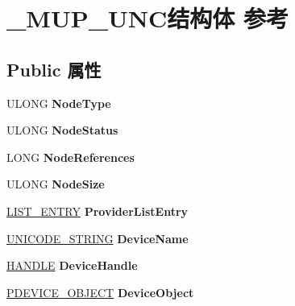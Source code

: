 \hypertarget{struct___m_u_p___u_n_c}{}\section{\+\_\+\+M\+U\+P\+\_\+\+U\+N\+C结构体 参考}
\label{struct___m_u_p___u_n_c}
\subsection*{Public 属性}
\begin{DoxyCompactItemize}
\item 
\mbox{\label{struct___m_u_p___u_n_c_ac0dc870206d93e0671028ed61d22523f}} 
U\+L\+O\+NG {\bfseries Node\+Type}
\item 
\mbox{\label{struct___m_u_p___u_n_c_abfa64a661474c972dedb7fb77a5fccd2}} 
U\+L\+O\+NG {\bfseries Node\+Status}
\item 
\mbox{\label{struct___m_u_p___u_n_c_a81c50d2c22b7f99720c29022b6cc6d22}} 
L\+O\+NG {\bfseries Node\+References}
\item 
\mbox{\label{struct___m_u_p___u_n_c_ad26d91a1d6baff7b0f78014e73dfbffd}} 
U\+L\+O\+NG {\bfseries Node\+Size}
\item 
\mbox{\label{struct___m_u_p___u_n_c_a013b5471598bbb363b4c3c60674d4c64}} 
\hyperlink{struct___l_i_s_t___e_n_t_r_y}{L\+I\+S\+T\+\_\+\+E\+N\+T\+RY} {\bfseries Provider\+List\+Entry}
\item 
\mbox{\label{struct___m_u_p___u_n_c_aeb2a4bb9d4b8088085427b29b6e65462}} 
\hyperlink{struct___u_n_i_c_o_d_e___s_t_r_i_n_g}{U\+N\+I\+C\+O\+D\+E\+\_\+\+S\+T\+R\+I\+NG} {\bfseries Device\+Name}
\item 
\mbox{\label{struct___m_u_p___u_n_c_a38d86ab1349d3ff92f69b1cd449466ba}} 
\hyperlink{interfacevoid}{H\+A\+N\+D\+LE} {\bfseries Device\+Handle}
\item 
\mbox{\label{struct___m_u_p___u_n_c_a910cae88bf2085c3091a9d3c33abc41e}} 
\hyperlink{struct___d_e_v_i_c_e___o_b_j_e_c_t}{P\+D\+E\+V\+I\+C\+E\+\_\+\+O\+B\+J\+E\+CT} {\bfseries Device\+Object}

\end{DoxyCompactItemize}
